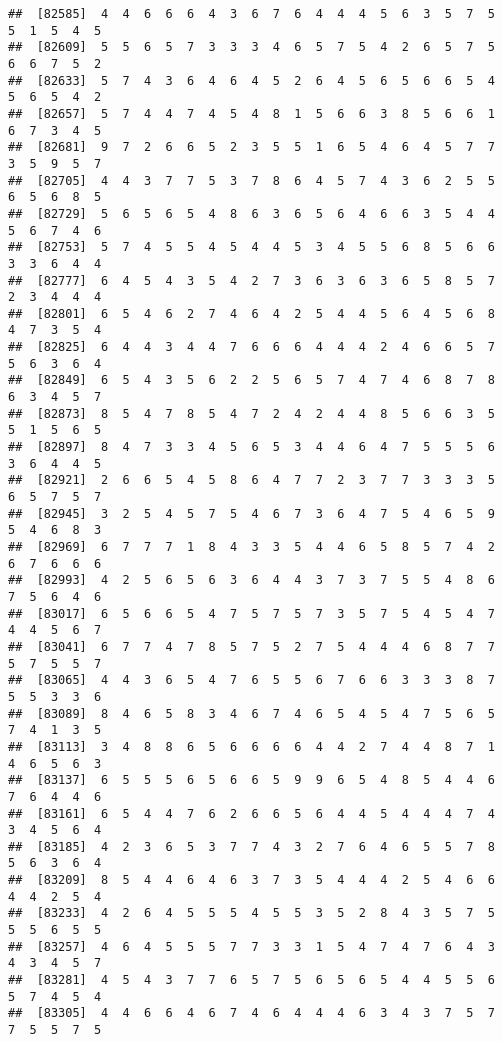 \documentclass[
]{book}
\begin{document}
\begin{verbatim}
##  [82585]  4  4  6  6  6  4  3  6  7  6  4  4  4  5  6  3  5  7  5  5  1  5  4  5
##  [82609]  5  5  6  5  7  3  3  3  4  6  5  7  5  4  2  6  5  7  5  6  6  7  5  2
##  [82633]  5  7  4  3  6  4  6  4  5  2  6  4  5  6  5  6  6  5  4  5  6  5  4  2
##  [82657]  5  7  4  4  7  4  5  4  8  1  5  6  6  3  8  5  6  6  1  6  7  3  4  5
##  [82681]  9  7  2  6  6  5  2  3  5  5  1  6  5  4  6  4  5  7  7  3  5  9  5  7
##  [82705]  4  4  3  7  7  5  3  7  8  6  4  5  7  4  3  6  2  5  5  6  5  6  8  5
##  [82729]  5  6  5  6  5  4  8  6  3  6  5  6  4  6  6  3  5  4  4  5  6  7  4  6
##  [82753]  5  7  4  5  5  4  5  4  4  5  3  4  5  5  6  8  5  6  6  3  3  6  4  4
##  [82777]  6  4  5  4  3  5  4  2  7  3  6  3  6  3  6  5  8  5  7  2  3  4  4  4
##  [82801]  6  5  4  6  2  7  4  6  4  2  5  4  4  5  6  4  5  6  8  4  7  3  5  4
##  [82825]  6  4  4  3  4  4  7  6  6  6  4  4  4  2  4  6  6  5  7  5  6  3  6  4
##  [82849]  6  5  4  3  5  6  2  2  5  6  5  7  4  7  4  6  8  7  8  6  3  4  5  7
##  [82873]  8  5  4  7  8  5  4  7  2  4  2  4  4  8  5  6  6  3  5  5  1  5  6  5
##  [82897]  8  4  7  3  3  4  5  6  5  3  4  4  6  4  7  5  5  5  6  3  6  4  4  5
##  [82921]  2  6  6  5  4  5  8  6  4  7  7  2  3  7  7  3  3  3  5  6  5  7  5  7
##  [82945]  3  2  5  4  5  7  5  4  6  7  3  6  4  7  5  4  6  5  9  5  4  6  8  3
##  [82969]  6  7  7  7  1  8  4  3  3  5  4  4  6  5  8  5  7  4  2  6  7  6  6  6
##  [82993]  4  2  5  6  5  6  3  6  4  4  3  7  3  7  5  5  4  8  6  7  5  6  4  6
##  [83017]  6  5  6  6  5  4  7  5  7  5  7  3  5  7  5  4  5  4  7  4  4  5  6  7
##  [83041]  6  7  7  4  7  8  5  7  5  2  7  5  4  4  4  6  8  7  7  5  7  5  5  7
##  [83065]  4  4  3  6  5  4  7  6  5  5  6  7  6  6  3  3  3  8  7  5  5  3  3  6
##  [83089]  8  4  6  5  8  3  4  6  7  4  6  5  4  5  4  7  5  6  5  7  4  1  3  5
##  [83113]  3  4  8  8  6  5  6  6  6  6  4  4  2  7  4  4  8  7  1  4  6  5  6  3
##  [83137]  6  5  5  5  6  5  6  6  5  9  9  6  5  4  8  5  4  4  6  7  6  4  4  6
##  [83161]  6  5  4  4  7  6  2  6  6  5  6  4  4  5  4  4  4  7  4  3  4  5  6  4
##  [83185]  4  2  3  6  5  3  7  7  4  3  2  7  6  4  6  5  5  7  8  5  6  3  6  4
##  [83209]  8  5  4  4  6  4  6  3  7  3  5  4  4  4  2  5  4  6  6  4  4  2  5  4
##  [83233]  4  2  6  4  5  5  5  4  5  5  3  5  2  8  4  3  5  7  5  5  5  6  5  5
##  [83257]  4  6  4  5  5  5  7  7  3  3  1  5  4  7  4  7  6  4  3  4  3  4  5  7
##  [83281]  4  5  4  3  7  7  6  5  7  5  6  5  6  5  4  4  5  5  6  5  7  4  5  4
##  [83305]  4  4  6  6  4  6  7  4  6  4  4  4  6  3  4  3  7  5  7  7  5  5  7  5

\end{verbatim}
\end{document}
